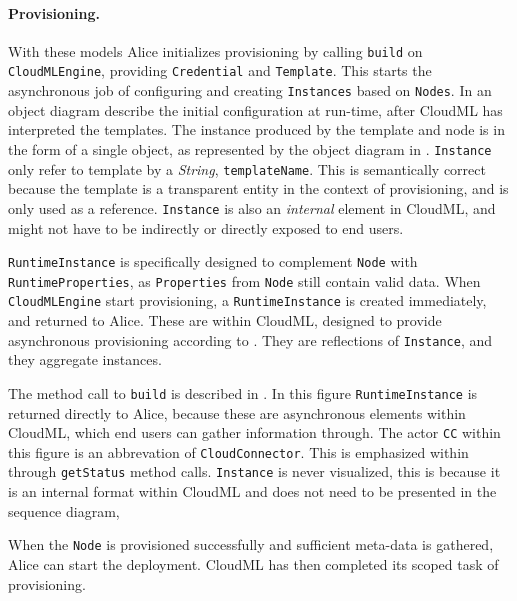 \paragraph{Provisioning.}



With these models Alice initializes provisioning by calling 
\texttt{build} on \texttt{CloudMLEngine}, providing \texttt{Credential} and \texttt{Template}.
This starts the asynchronous job of configuring and creating 
\texttt{Instances} based on \texttt{Nodes}.
In  an object diagram describe the initial configuration at run-time,
after CloudML has interpreted the templates.
The instance produced by the template and node is in the form of a single object,
as represented by the object diagram in .
\texttt{Instance} only refer to template by a \emph{String}, \texttt{templateName}.
This is semantically correct because the template is a transparent entity
in the context of provisioning, and is only used as a reference.
\texttt{Instance} is also an \emph{internal} element in CloudML, and might not 
have to be indirectly or directly exposed to end users.

\texttt{RuntimeInstance} is specifically designed to complement \texttt{Node} with \texttt{RuntimeProperties},
as \texttt{Properties} from \texttt{Node} still contain valid data.
When \texttt{CloudMLEngine} start provisioning, a \texttt{RuntimeInstance} is created immediately,
and returned to Alice.
These are  within CloudML, designed to provide asynchronous provisioning
according to .
They are reflections of \texttt{Instance}, and they aggregate instances.

The method call to \texttt{build} is described in .
In this figure \texttt{RuntimeInstance} is returned directly to Alice,
because these are asynchronous elements within CloudML, which end users can gather 
information through.
The actor \texttt{CC} within this figure is an abbrevation of \texttt{CloudConnector}.
This is emphasized within  through \texttt{getStatus} method calls.
\texttt{Instance} is never visualized, this is because it is an internal format
within CloudML and does not need to be presented in the sequence diagram,

When the \texttt{Node} is provisioned successfully and sufficient meta-data is gathered,
Alice can start the deployment.
CloudML has then completed its scoped task of provisioning.

